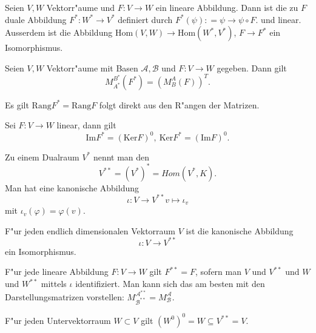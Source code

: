 \documentclass[9pt, a4paper, twocolumn, landscape]{article}
\begin{document}
\begin{definition}
Seien $V, W$ Vektorr"aume und $F : V \rightarrow W$ ein lineare Abbildung. Dann ist die zu $F$ duale Abbildung
$
F^* : W^* \rightarrow V^*
$
definiert durch
$
F^*(\psi) : = \psi \rightarrow \psi \circ F.
$
und linear. Ausserdem ist die Abbildung $\mathrm{Hom}(V, W) \rightarrow \mathrm{Hom} (W^*, V^*)$, $F \rightarrow F^*$ ein Isomorphismus.
\end{definition}
 


\begin{theorem}
 Seien $V, W$ Vektorr"aume mit Basen $\mathcal{A}, \mathcal{B}$ und $F : V \rightarrow W$ gegeben. Dann gilt
$$
 M^{B^*}_{A^*}(F^*) = \left(M^{A}_B(F)\right)^T.
$$
\end{theorem}

\begin{corollary}
Es gilt $\mathrm{Rang}F^* = \mathrm{Rang}F$ folgt direkt aus den R"angen der Matrizen.
\end{corollary}

\begin{theorem}
Sei $F : V \rightarrow W$ linear, dann gilt 
$$
\mathrm{Im}F^* = \left( \mathrm{Ker} F \right)^0, \ \mathrm{Ker}F^* = \left( \mathrm{Im} F \right)^0.
$$
\end{theorem}


\begin{definition}
Zu einem Dualraum $V^*$ nennt man den 
$$
V ^{**} = (V^*)^* = Hom(V^*, K).
$$
Man hat eine kanonische Abbildung 
$$
\iota : V \rightarrow V^{**}
v \mapsto \iota_v
$$
mit $\iota_v(\varphi) = \varphi (v)$.
\end{definition}

\begin{theorem}
F"ur jeden endlich dimensionalen Vektorraum $V$ ist die kanonische Abbildung
$$
\iota : V \rightarrow V^{**}
$$
ein Isomorphismus.
\end{theorem}

\begin{corollary}
F"ur jede lineare Abbildung $F : V \rightarrow W$ gilt $F^{**} = F$, sofern man $V$ und $V^{**}$ und $W$ und $W^{**}$ mittels $\iota$ identifiziert. Man kann sich das am besten mit den Darstellungsmatrizen vorstellen: $M^{\mathcal{A}^{**}}_{\mathcal{B}^{**}} = M^\mathcal{A}_\mathcal{B}$.
\end{corollary}

\begin{remark}
F"ur jeden Untervektorraum $W \subset V$ gilt $(W^0)^0 = W \subseteq V^{**} = V$.
\end{remark}
\end{document}
